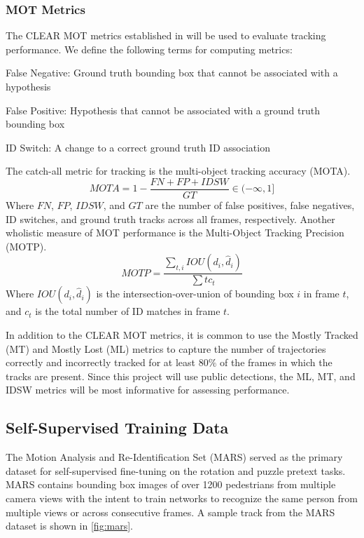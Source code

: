 \documentclass[10pt,twocolumn,letterpaper]{article}
\begin{document}
\subsubsection{MOT Metrics}
The CLEAR MOT metrics established in \cite{Bernardin2008} will be used to evaluate tracking performance. We define the following terms for computing metrics:
\begin{myitemize}
    \item False Negative: Ground truth bounding box that cannot be associated with a hypothesis
    \item False Positive: Hypothesis that cannot be associated with a ground truth bounding box
    \item ID Switch: A change to a correct ground truth ID association
\end{myitemize}
The catch-all metric for tracking is the multi-object tracking accuracy (MOTA).
\begin{equation}
    MOTA = 1-\frac{FN+FP+IDSW}{GT}  \in (-\infty, 1]
\end{equation}
Where $FN$, $FP$, $IDSW$, and $GT$ are the number of false positives, false negatives, ID switches, and ground truth tracks across all frames, respectively. Another wholistic measure of MOT performance is the Multi-Object Tracking Precision (MOTP).
\begin{equation}
    MOTP = \frac{\sum_{t,i} IOU(d_i, \hat{d}_i)}{\sum{t} c_t}
\end{equation}
Where $IOU(d_i, \hat{d}_i)$ is the intersection-over-union of bounding box $i$ in frame $t$, and $c_t$ is the total number of ID matches in frame $t$.

In addition to the CLEAR MOT metrics, it is common to use the Mostly Tracked (MT) and Mostly Lost (ML) metrics to capture the number of trajectories correctly and incorrectly tracked for at least $80\%$ of the frames in which the tracks are present. Since this project will use public detections, the ML, MT, and IDSW metrics will be most informative for assessing performance.

\subsection{Self-Supervised Training Data}
The Motion Analysis and Re-Identification Set (MARS) \cite{zheng2016mars} served as the primary dataset for self-supervised fine-tuning on the rotation and puzzle pretext tasks. MARS contains bounding box images of over 1200 pedestrians from multiple camera views with the intent to train networks to recognize the same person from multiple views or across consecutive frames. A sample track from the MARS dataset is shown in \ref{fig:mars}.
\end{document}
